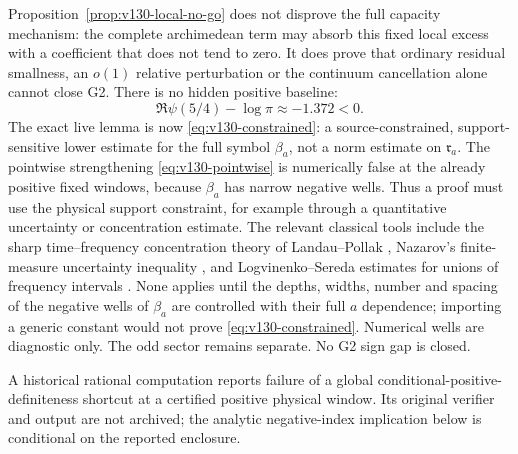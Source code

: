 \documentclass[11pt]{article}
\theoremstyle{remark}
\begin{document}
Proposition~\ref{prop:v130-local-no-go} does not disprove the full
capacity mechanism: the complete archimedean term may absorb this
fixed local excess with a coefficient that does not tend to zero.
It does prove that ordinary residual smallness, an $o(1)$ relative
perturbation or the continuum cancellation alone cannot close G2.
There is no hidden positive baseline:
\[
 \Re\psi(5/4)-\log\pi\approx-1.372<0.
\]
The exact live lemma is now \eqref{eq:v130-constrained}: a
source-constrained, support-sensitive lower estimate for the full
symbol $\beta_a$, not a norm estimate on $\mathfrak r_a$. The
pointwise strengthening \eqref{eq:v130-pointwise} is numerically false
at the already positive fixed windows, because $\beta_a$ has narrow
negative wells. Thus a proof must use the physical support constraint,
for example through a quantitative uncertainty or concentration
estimate. The relevant classical tools include the sharp
time--frequency concentration theory of Landau--Pollak
\cite{LandauPollak1961}, Nazarov's finite-measure uncertainty
inequality \cite{Nazarov1994}, and Logvinenko--Sereda estimates for
unions of frequency intervals \cite{Kovrijkine2000}. None applies
until the depths, widths, number and spacing of the negative wells of
$\beta_a$ are controlled with their full $a$ dependence; importing a
generic constant would not prove \eqref{eq:v130-constrained}.
Numerical wells are diagnostic only. The odd sector remains separate.
No G2 sign gap is closed.

A historical rational computation reports failure of a global
conditional-positive-definiteness shortcut at a certified positive physical
window. Its original verifier and output are not archived; the analytic
negative-index implication below is conditional on the reported enclosure.
\end{document}
